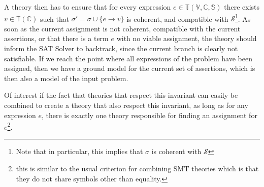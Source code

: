 \documentclass{article}
\begin{document}
A theory then has to ensure that for every expression $e \in \mathbb{T}(\mathbb{V,C,S})$
there exists $v \in \mathbb{T}(\mathbb{C})$ such that $\sigma' = \sigma \cup \{ e \rightarrow v \}$
is coherent, and compatible with $\mathcal{S}$\footnote{Note that in particular, this implies
that $\sigma$ is coherent with $\mathcal{S}$}. As soon as the current assignment is not coherent,
compatible with the current assertions, or that there is a term $e$ with no viable assignment, the theory
should inform the SAT Solver to backtrack, since the current branch is clearly not satisfiable.
If we reach the point where all expressions of the problem have been assigned, then we
have a ground model for the current set of assertions, which is then also a model
of the input problem.

Of interest if the fact that theories that respect this invariant can easily be combined
to create a theory that also respect this invariant, as long as for any expression $e$,
there is exactly one theory responsible for finding an assignment for $e$\footnote{this
is similar to the usual criterion for combining SMT theories which is that they do not
share symbols other than equality.}.


\clearpage




\clearpage
\appendix
\end{document}
